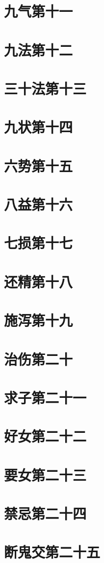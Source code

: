 \documentclass[a4paper,12pt,UTF8,twoside]{ctexbook}
\begin{document}
\chapter{九气第十一}
\chapter{九法第十二}
\chapter{三十法第十三}
\chapter{九状第十四}
\chapter{六势第十五}
\chapter{八益第十六}
\chapter{七损第十七}
\chapter{还精第十八}
\chapter{施泻第十九}
\chapter{治伤第二十}
\chapter{求子第二十一}
\chapter{好女第二十二}
\chapter{要女第二十三}
\chapter{禁忌第二十四}
\chapter{断鬼交第二十五}
\end{document}
